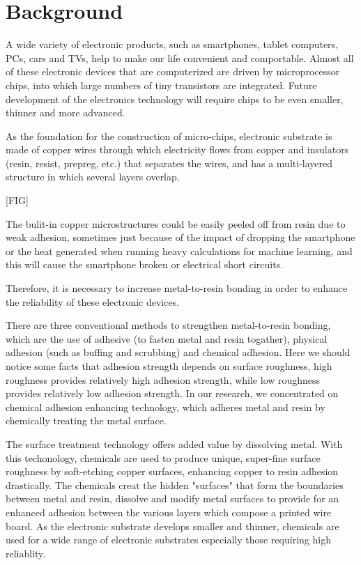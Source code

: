 \documentclass[10pt,twocolumn,letterpaper]{article}
\begin{document}
\section{Background}
A wide variety of electronic products, such as smartphones, tablet computers, PCs, cars and TVs, help to make our life convenient and comportable.
Almost all of these electronic devices that are computerized are driven by microprocessor chips, into which large numbers of tiny transistors are integrated.
Future development of the electronics technology will require chips to be even smaller, thinner and more advanced.

As the foundation for the construction of micro-chips, electronic substrate is made of copper wires through which electricity flows from copper and insulators (resin, resist, prepreg, etc.) that separates the wires, and has a multi-layered structure in which several layers overlap.

[FIG]

The bulit-in copper microstructures could be easily peeled off from resin due to weak adhesion, sometimes just because of the impact of dropping the smartphone or the heat generated when running heavy calculations for machine learning, and this will cause the smartphone broken or electrical short circuits.

Therefore, it is necessary to increase metal-to-resin bonding in order to enhance the reliability of these electronic devices.

There are three conventional methods to strengthen metal-to-resin bonding, which are the use of adhesive (to fasten metal and resin togather), physical adhesion (such as buffing and scrubbing) and chemical adhesion.
Here we should notice some facts that adhesion strength depends on surface roughness, high roughness provides relatively high adhesion strength, while low roughness provides relatively low adhesion strength.
In our research, we concentrated on chemical adhesion enhancing technology, which adheres metal and resin by chemically treating the metal surface.

The surface treatment technology offers added value by dissolving metal.
With this techonology, chemicals are used to produce unique, super-fine surface roughness by soft-etching copper surfaces, enhancing copper to resin adhesion drastically.
The chemicals creat the hidden "surfaces" that form the boundaries between metal and resin, dissolve and modify metal surfaces to provide for an enhanced adhesion between the various layers which compose a printed wire board. 
As the electronic substrate develops smaller and thinner, chemicals are used for a wide range of electronic substrates especially those requiring high reliablity. 
\end{document}
